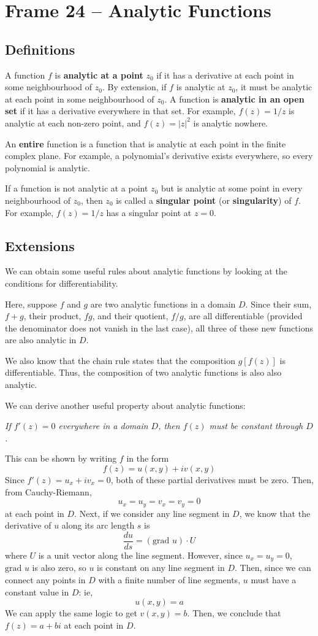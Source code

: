 \documentclass{article}
\renewcommand{\emph}{\textbf}
\begin{document}
\clearpage
\section{Frame 24 -- Analytic Functions}
\subsection{Definitions}
A function $f$ is \emph{analytic at a point} $z_0$ if it has a derivative at each point in some neighbourhood of $z_0$. By extension, if $f$ is analytic at $z_0$, it must be analytic at each point in some neighbourhood of $z_0$. A function is \emph{analytic in an open set} if it has a derivative everywhere in that set. For example, $f(z) = 1/z$ is analytic at each non-zero point, and $f(z) = |z|^2$ is analytic nowhere.

An \emph{entire} function is a function that is analytic at each point in the finite complex plane. For example, a polynomial's derivative exists everywhere, so every polynomial is analytic.

If a function is not analytic at a point $z_0$ but is analytic at some point in every neighbourhood of $z_0$, then $z_0$ is called a \emph{singular point} (or \emph{singularity}) of $f$. For example, $f(z) = 1/z$ has a singular point at $z = 0$.

\subsection{Extensions}
We can obtain some useful rules about analytic functions by looking at the conditions for differentiability. 

Here, suppose $f$ and $g$ are two analytic functions in a domain $D$. Since their sum, $f + g$, their product, $fg$, and their quotient, $f/g$, are all differentiable (provided the denominator does not vanish in the last case), all three of these new functions are also analytic in $D$.

We also know that the chain rule states that the composition $g[f(z)]$ is differentiable. Thus, the composition of two analytic functions is also also analytic.

We can derive another useful property about analytic functions:

\textit{If $f'(z) = 0$ everywhere in a domain $D$, then $f(z)$ must be constant through $D$.}

This can be shown by writing $f$ in the form
\[
	f(z) = u(x, y) + iv(x, y)
\]
Since $f'(z) = u_x + iv_x = 0$, both of these partial derivatives must be zero. Then, from Cauchy-Riemann,
\[
	u_x = u_y = v_x = v_y = 0
\]
at each point in $D$. Next, if we consider any line segment in $D$, we know that the derivative of $u$ along its arc length $s$ is
\[
	\frac{du}{ds} = (\text{grad } u) \cdot U
\]
where $U$ is a unit vector along the line segment. However, since $u_x = u_y = 0$, $\text{grad } u$ is also zero, so $u$ is constant on any line segment in $D$. Then, since we can connect any points in $D$ with a finite number of line segments, $u$ must have a constant value in $D$: ie,
\[
	u(x, y) = a
\]
We can apply the same logic to get $v(x, y) = b$. Then, we conclude that $f(z) = a + bi$ at each point in $D$.
\end{document}
